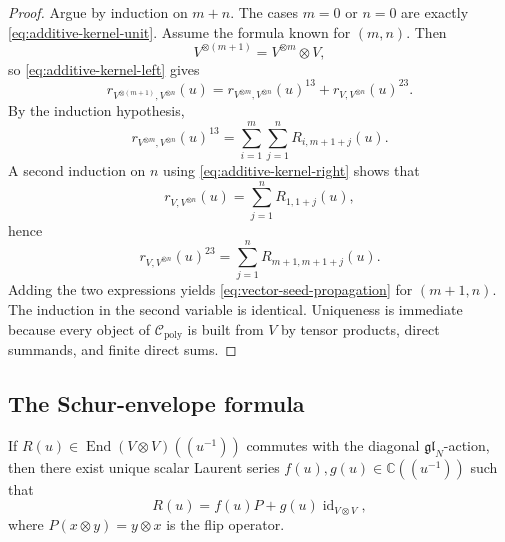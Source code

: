\begin{proof}
Argue by induction on $m+n$. The cases $m=0$ or $n=0$ are exactly
\eqref{eq:additive-kernel-unit}. Assume the formula known for
$(m,n)$. Then
\begin{equation}
V^{\otimes(m+1)}=V^{\otimes m}\otimes V,
\end{equation}
so \eqref{eq:additive-kernel-left} gives
\begin{equation}
r_{V^{\otimes(m+1)},V^{\otimes n}}(u)
=
r_{V^{\otimes m},V^{\otimes n}}(u)^{13}
+
r_{V,V^{\otimes n}}(u)^{23}.
\end{equation}
By the induction hypothesis,
\begin{equation}
r_{V^{\otimes m},V^{\otimes n}}(u)^{13}
=
\sum_{i=1}^{m}\sum_{j=1}^{n}R_{i,m+1+j}(u).
\end{equation}
A second induction on $n$ using \eqref{eq:additive-kernel-right} shows
that
\begin{equation}
r_{V,V^{\otimes n}}(u)=\sum_{j=1}^n R_{1,1+j}(u),
\end{equation}
hence
\begin{equation}
r_{V,V^{\otimes n}}(u)^{23}
=
\sum_{j=1}^n R_{m+1,m+1+j}(u).
\end{equation}
Adding the two expressions yields \eqref{eq:vector-seed-propagation} for
$(m+1,n)$. The induction in the second variable is identical. Uniqueness
is immediate because every object of $\mathcal C_{\mathrm{poly}}$ is built
from $V$ by tensor products, direct summands, and finite direct sums.
\end{proof}

\subsection{The Schur-envelope formula}

\begin{lemma}
\ClaimStatusProvedHere
\label{lem:equivariant-normal-form}
If $R(u)\in \operatorname{End}(V\otimes V)((u^{-1}))$ commutes with the
diagonal $\mathfrak{gl}_N$-action, then there exist unique scalar Laurent
series $f(u),g(u)\in \mathbb C((u^{-1}))$ such that
\begin{equation}
R(u)=f(u)P+g(u)\operatorname{id}_{V\otimes V},
\end{equation}
where $P(x\otimes y)=y\otimes x$ is the flip operator.
\end{lemma}

